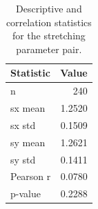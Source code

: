 \begin{table}[htbp]
\caption{Descriptive and correlation statistics for the stretching parameter pair.}
\label{tab:stretching_scatter}
\begin{tabular}{lr}
\toprule
Statistic & Value \\
\midrule
n & 240 \\
sx mean & 1.2520 \\
sx std & 0.1509 \\
sy mean & 1.2621 \\
sy std & 0.1411 \\
Pearson r & 0.0780 \\
p-value & 0.2288 \\
\bottomrule
\end{tabular}
\end{table}
